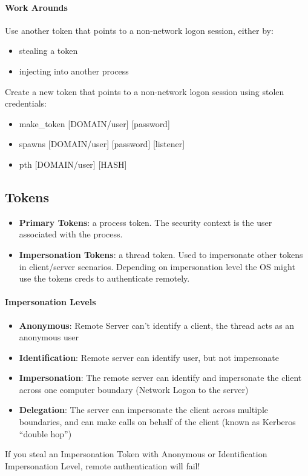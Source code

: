 \paragraph{Work Arounds}
Use another token that points to a non-network logon session, either by:
\begin{itemize}
  \item stealing a token
  \item injecting into another process
\end{itemize}
Create a new token that points to a non-network logon session using stolen credentials:
\begin{itemize}
  \item make\_token [DOMAIN/user] [password]
  \item spawns [DOMAIN/user] [password] [listener]
  \item pth [DOMAIN/user] [HASH]
\end{itemize}

\subsection{Tokens}
\begin{itemize}
  \item \textbf{Primary Tokens}: a process token. The security context is the user associated with the process.
  \item \textbf{Impersonation Tokens}: a thread token. Used to impersonate other tokens in client/server scenarios. Depending on impersonation level the OS might use the tokens creds to authenticate remotely.
\end{itemize}
\paragraph{Impersonation Levels}
\begin{itemize}
  \item \textbf{Anonymous}: Remote Server can't identify a client, the thread acts as an anonymous user
  \item \textbf{Identification}: Remote server can identify user, but not impersonate
  \item \textbf{Impersonation}: The remote server can identify and impersonate the client across one computer boundary (Network Logon to the server)
  \item \textbf{Delegation}: The server can impersonate the client across multiple boundaries, and can make calls on behalf of the client (known as Kerberos ``double hop'')
\end{itemize}
If you steal an Impersonation Token with Anonymous or Identification Impersonation Level, remote authentication will fail!\\

